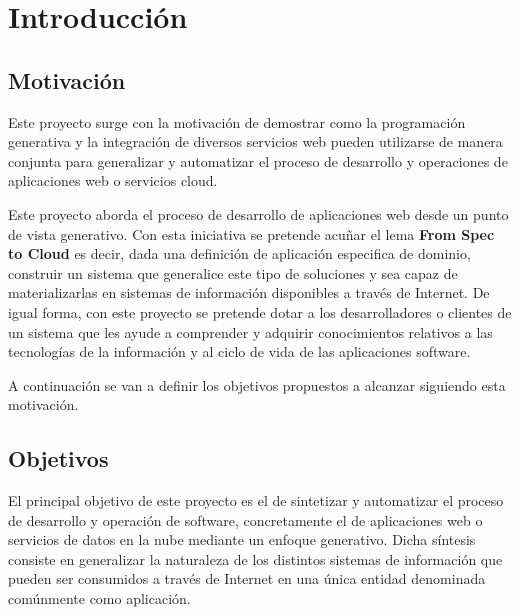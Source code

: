 \documentclass[a4paper,11pt]{book}
\begin{document}


%


\newpage

\newpage

\newpage

\newpage

\tableofcontents
\listoffigures


\chapter{Introducción}

\section{Motivación}

Este proyecto surge con la motivación de demostrar como la programación generativa y  la integración de diversos servicios web pueden utilizarse de manera conjunta para generalizar y automatizar el proceso de desarrollo y operaciones de aplicaciones web o servicios cloud.

Este proyecto aborda el proceso de desarrollo de aplicaciones web desde un punto de vista generativo.  Con esta iniciativa se pretende acuñar el lema \textbf{From Spec to Cloud} es decir, dada una definición de aplicación especifica de dominio, construir un sistema que generalice este tipo de soluciones y sea capaz de materializarlas en sistemas de información disponibles a través de Internet. De igual forma, con este proyecto se pretende dotar a los desarrolladores o clientes de un sistema que les ayude a comprender y adquirir conocimientos relativos a las tecnologías de la información y al ciclo de vida de las aplicaciones software.

A continuación se van a definir los objetivos propuestos a alcanzar siguiendo esta motivación.

\section{Objetivos}

El principal objetivo de este proyecto es el de sintetizar y automatizar el proceso de desarrollo y operación de software, concretamente el de aplicaciones web o servicios de datos en la nube mediante un enfoque generativo. Dicha síntesis consiste en generalizar la naturaleza de los distintos sistemas de información que pueden ser consumidos a través de Internet en una única entidad denominada comúnmente como aplicación.
\end{document}
